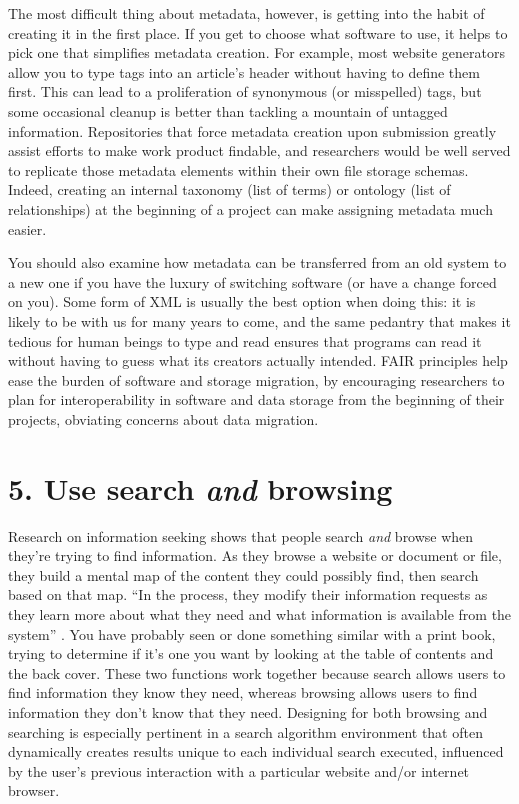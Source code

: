\documentclass[10pt,letterpaper]{article}
\newcommand{\rulemajor}[1]{\section*{#1}}
\begin{document}
The most difficult thing about metadata, however, is getting into the habit of
creating it in the first place. If you get to choose what software to use, it
helps to pick one that simplifies metadata creation. For example, most website
generators allow you to type tags into an article's header without having to
define them first. This can lead to a proliferation of synonymous (or
misspelled) tags, but some occasional cleanup is better than tackling a mountain
of untagged information. Repositories that force metadata creation upon submission 
greatly assist efforts to make work product findable, and researchers would be 
well served to replicate those metadata elements within their own file storage 
schemas. Indeed, creating an internal taxonomy (list of terms) or ontology (list of
relationships) at the beginning of a project can make assigning metadata much easier.

You should also examine how metadata can be transferred from an old system to a
new one if you have the luxury of switching software (or have a change
forced on you). Some form of XML is usually the best option when doing this: it
is likely to be with us for many years to come, and the same pedantry that makes
it tedious for human beings to type and read ensures that programs can read it
without having to guess what its creators actually intended.
FAIR principles help ease the burden of software and storage migration, by encouraging researchers to plan for interoperability in software and data storage from the beginning of their projects, obviating concerns about data migration.

\rulemajor{5. Use search \emph{and} browsing}

Research on information seeking shows that people search \emph{and} browse when
they're trying to find information. As they browse a website or document or
file, they build a mental map of the content they could possibly find, then
search based on that map. ``In the process, they modify their information
requests as they learn more about what they need and what information is
available from the system'' \cite{Rosenfeld2015}. You have probably seen or done
something similar with a print book, trying to determine if it's one you want by
looking at the table of contents and the back cover. These two functions work
together because search allows users to find information they know they need,
whereas browsing allows users to find information they don't know that they 
need\cite{Bates2002}. Designing for both browsing and searching is especially 
pertinent in a search algorithm environment that often dynamically creates 
results unique to each individual search executed, influenced by the user's 
previous interaction with a particular website and/or internet browser.
\end{document}
